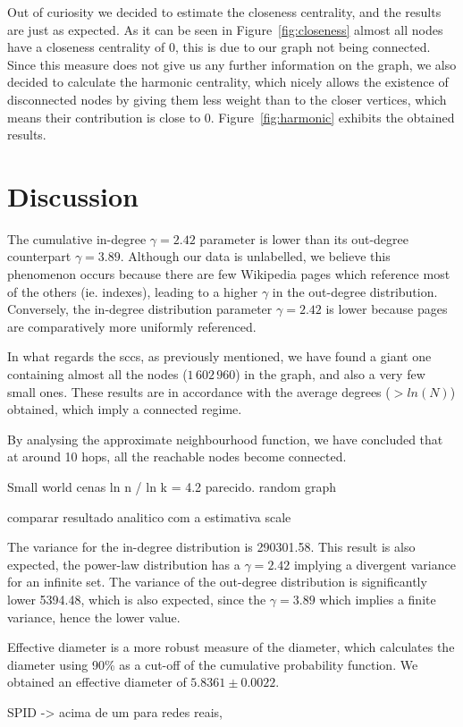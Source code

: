 \documentclass[9pt,a4paper,twocolumn]{article}
\begin{document}
Out of curiosity we decided to estimate the closeness centrality, and the results are just as expected. As it can be seen in Figure~\ref{fig:closeness} almost all nodes have a closeness centrality of 0, this is due to our graph not being connected. Since this measure does not give us any further information on the graph, we also decided to calculate the harmonic centrality, which nicely allows the existence of disconnected nodes by giving them less weight than to the closer vertices, which means their contribution is close to 0. Figure~\ref{fig:harmonic} exhibits the obtained results.

\section{Discussion}

The cumulative in-degree $\gamma = 2.42$ parameter is lower than its out-degree counterpart $\gamma = 3.89$. Although our data is unlabelled, we believe this phenomenon occurs because there are few Wikipedia pages which reference most of the others (ie. indexes), leading to a higher $\gamma$ in the out-degree distribution. Conversely, the in-degree distribution parameter $\gamma = 2.42$ is lower because pages are comparatively more uniformly referenced.

In what regards the \acrshort{scc}s, as previously mentioned, we have found a giant one %
containing almost all the nodes ($1\,602\,960$) in the graph, and also a very few small ones. These results are in accordance with the average degrees ($> ln(N)$) obtained, which imply a connected regime.

By analysing the approximate neighbourhood function, we have concluded that at around 10 hops, all the reachable nodes become connected.

Small world cenas ln n / ln k = 4.2 parecido. random graph


comparar resultado analitico com a estimativa scale


The variance for the in-degree distribution is 290301.58. This result is also expected, the power-law distribution has a $\gamma = 2.42$ implying a divergent variance for an infinite set. The variance of the out-degree distribution is significantly lower 5394.48, which is also expected, since the $ \gamma = 3.89 $ which implies a finite variance, hence the lower value.

Effective diameter is a more robust measure of the diameter, which calculates the diameter using 90\% as a cut-off of the cumulative probability function. We obtained an effective diameter of $5.8361 \pm 0.0022$.


SPID -> acima de um para redes reais, 

\printglossary[type=\acronymtype]



\end{document}
